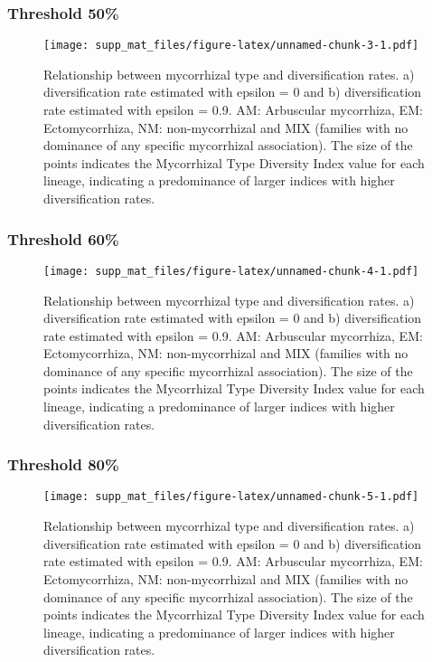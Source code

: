 \documentclass[]{article}
\begin{document}
\hypertarget{threshold-50}{%
\subsubsection{Threshold 50\%}\label{threshold-50}}

\begin{figure}
\centering
\texttt{[image: supp\_mat\_files/figure-latex/unnamed-chunk-3-1.pdf]}
\caption{Relationship between mycorrhizal type and diversification
rates. a) diversification rate estimated with epsilon = 0 and b)
diversification rate estimated with epsilon = 0.9. AM: Arbuscular
mycorrhiza, EM: Ectomycorrhiza, NM: non-mycorrhizal and MIX (families
with no dominance of any specific mycorrhizal association). The size of
the points indicates the Mycorrhizal Type Diversity Index value for each
lineage, indicating a predominance of larger indices with higher
diversification rates.}
\end{figure}

\hypertarget{threshold-60}{%
\subsubsection{Threshold 60\%}\label{threshold-60}}

\begin{figure}
\centering
\texttt{[image: supp\_mat\_files/figure-latex/unnamed-chunk-4-1.pdf]}
\caption{Relationship between mycorrhizal type and diversification
rates. a) diversification rate estimated with epsilon = 0 and b)
diversification rate estimated with epsilon = 0.9. AM: Arbuscular
mycorrhiza, EM: Ectomycorrhiza, NM: non-mycorrhizal and MIX (families
with no dominance of any specific mycorrhizal association). The size of
the points indicates the Mycorrhizal Type Diversity Index value for each
lineage, indicating a predominance of larger indices with higher
diversification rates.}
\end{figure}

\hypertarget{threshold-80}{%
\subsubsection{Threshold 80\%}\label{threshold-80}}

\begin{figure}
\centering
\texttt{[image: supp\_mat\_files/figure-latex/unnamed-chunk-5-1.pdf]}
\caption{Relationship between mycorrhizal type and diversification
rates. a) diversification rate estimated with epsilon = 0 and b)
diversification rate estimated with epsilon = 0.9. AM: Arbuscular
mycorrhiza, EM: Ectomycorrhiza, NM: non-mycorrhizal and MIX (families
with no dominance of any specific mycorrhizal association). The size of
the points indicates the Mycorrhizal Type Diversity Index value for each
lineage, indicating a predominance of larger indices with higher
diversification rates.}
\end{figure}
\end{document}

